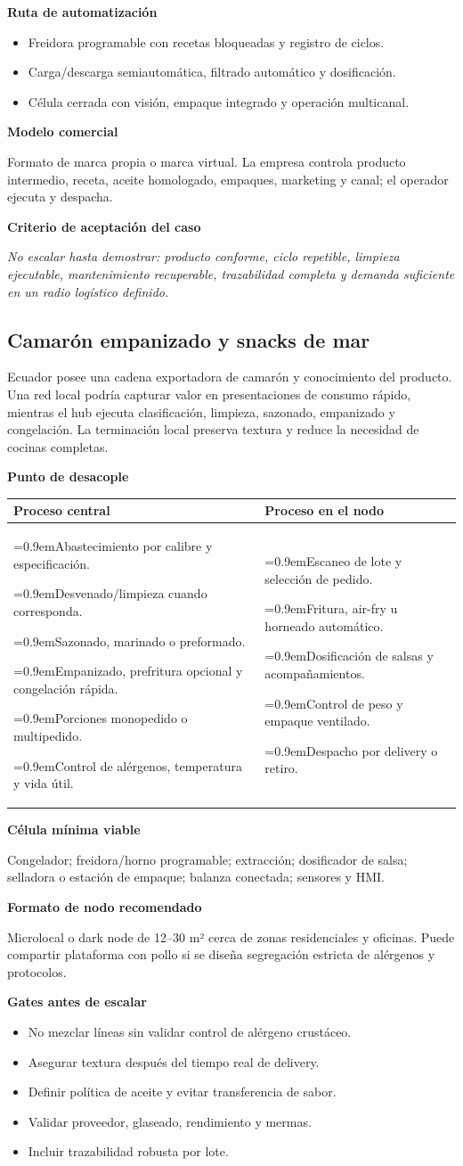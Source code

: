 \documentclass[11pt,a4paper]{article}
\makeatletter
\newcommand{\etiqueta}[1]{\par\medskip\noindent\textbf{#1}\par\nopagebreak\smallskip}
\newcommand{\ti}{\par\hangindent=0.9em\hangafter=1\noindent\makebox[0.9em][l]{\textbullet}}
\newcommand{\desacople}[2]{\etiqueta{Punto de desacople}
  {\small\noindent\begin{tabularx}{\textwidth}{@{}>{\raggedright\arraybackslash}X>{\raggedright\arraybackslash}X@{}}
  \toprule \textbf{Proceso central} & \textbf{Proceso en el nodo}\\ \midrule
  #1 & #2\\ \bottomrule\end{tabularx}}\par}
\newcommand{\rutas}[3]{\etiqueta{Ruta de automatización}
  \begin{itemize}[leftmargin=2.6em,labelwidth=2em]
  \item[\textbf{1.0}] #1
  \item[\textbf{2.0}] #2
  \item[\textbf{3.0}] #3
  \end{itemize}}
\newcommand{\criterio}{\etiqueta{Criterio de aceptación del caso}
  \noindent\textit{No escalar hasta demostrar: producto conforme, ciclo repetible, limpieza ejecutable,
  mantenimiento recuperable, trazabilidad completa y demanda suficiente en un radio logístico definido.}\par}
\makeatother
\begin{document}
\rutas{Freidora programable con recetas bloqueadas y registro de ciclos.}
{Carga/descarga semiautomática, filtrado automático y dosificación.}
{Célula cerrada con visión, empaque integrado y operación multicanal.}

\etiqueta{Modelo comercial}
Formato de marca propia o marca virtual. La empresa controla producto intermedio, receta, aceite
homologado, empaques, marketing y canal; el operador ejecuta y despacha.

\criterio

\subsection{Camarón empanizado y snacks de mar}
Ecuador posee una cadena exportadora de camarón y conocimiento del producto. Una red local podría capturar
valor en presentaciones de consumo rápido, mientras el hub ejecuta clasificación, limpieza, sazonado,
empanizado y congelación. La terminación local preserva textura y reduce la necesidad de cocinas
completas.

\desacople{%
\ti Abastecimiento por calibre y especificación.
\ti Desvenado/limpieza cuando corresponda.
\ti Sazonado, marinado o preformado.
\ti Empanizado, prefritura opcional y congelación rápida.
\ti Porciones monopedido o multipedido.
\ti Control de alérgenos, temperatura y vida útil.}{%
\ti Escaneo de lote y selección de pedido.
\ti Fritura, air-fry u horneado automático.
\ti Dosificación de salsas y acompañamientos.
\ti Control de peso y empaque ventilado.
\ti Despacho por delivery o retiro.}

\etiqueta{Célula mínima viable}
Congelador; freidora/horno programable; extracción; dosificador de salsa; selladora o estación de
empaque; balanza conectada; sensores y HMI.

\etiqueta{Formato de nodo recomendado}
Microlocal o dark node de 12--30 m² cerca de zonas residenciales y oficinas. Puede compartir plataforma
con pollo si se diseña segregación estricta de alérgenos y protocolos.

\etiqueta{Gates antes de escalar}
\begin{itemize}
\item No mezclar líneas sin validar control de alérgeno crustáceo.
\item Asegurar textura después del tiempo real de delivery.
\item Definir política de aceite y evitar transferencia de sabor.
\item Validar proveedor, glaseado, rendimiento y mermas.
\item Incluir trazabilidad robusta por lote.
\end{itemize}
\end{document}
